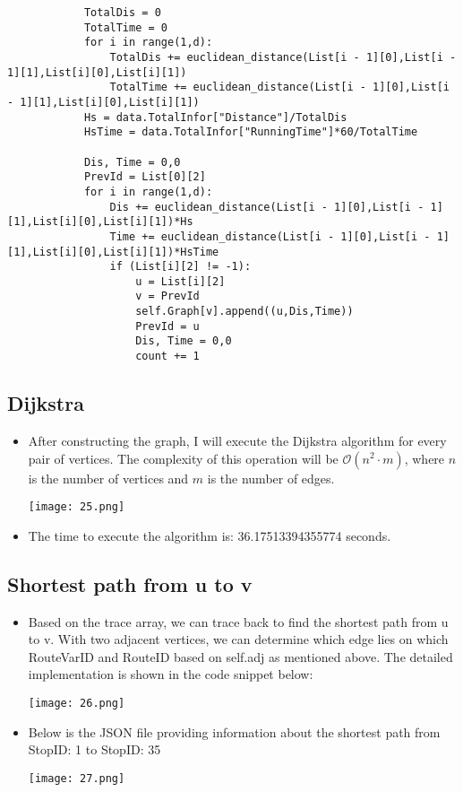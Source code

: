 \documentclass[12pt]{scrartcl}
\begin{document}
\begin{itemize}
\begin{lstlisting}
            TotalDis = 0
            TotalTime = 0
            for i in range(1,d):
                TotalDis += euclidean_distance(List[i - 1][0],List[i - 1][1],List[i][0],List[i][1])
                TotalTime += euclidean_distance(List[i - 1][0],List[i - 1][1],List[i][0],List[i][1])
            Hs = data.TotalInfor["Distance"]/TotalDis
            HsTime = data.TotalInfor["RunningTime"]*60/TotalTime

            Dis, Time = 0,0
            PrevId = List[0][2]
            for i in range(1,d):
                Dis += euclidean_distance(List[i - 1][0],List[i - 1][1],List[i][0],List[i][1])*Hs
                Time += euclidean_distance(List[i - 1][0],List[i - 1][1],List[i][0],List[i][1])*HsTime
                if (List[i][2] != -1):
                    u = List[i][2]
                    v = PrevId
                    self.Graph[v].append((u,Dis,Time))
                    PrevId = u
                    Dis, Time = 0,0
                    count += 1
\end{lstlisting}
\end{itemize}
\newpage
\subsection{Dijkstra}
\begin{itemize}
\item After constructing the graph, I will execute the Dijkstra algorithm for every pair of vertices. The complexity of this operation will be $\mathcal{O}(n^2 \cdot m)$, where $n$ is the number of vertices and $m$ is the number of edges.
        \begin{center}
            \texttt{[image: 25.png]}
        \end{center}
\item The time to execute the algorithm is: 36.17513394355774 seconds.
\end{itemize}
\newpage
\subsection{Shortest path from u to v}
\begin{itemize}
\item Based on the trace array, we can trace back to find the shortest path from u to v. With two adjacent vertices, we can determine which edge lies on which RouteVarID and RouteID based on self.adj as mentioned above. The detailed implementation is shown in the code snippet below:
        \begin{center}
            \texttt{[image: 26.png]}
        \end{center}
\newpage 
\item Below is the JSON file providing information about the shortest path from StopID: 1 to StopID: 35

        \begin{center}
            \texttt{[image: 27.png]}
        \end{center}
\end{itemize}
\end{document}
